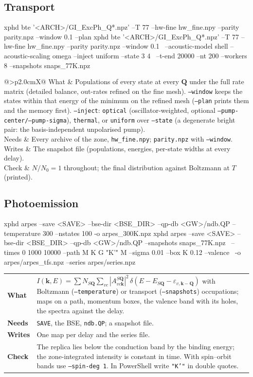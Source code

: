 \documentclass[10pt,a4paper]{article}
\makeatletter
\newcommand{\bQ}{\mathbf{Q}}
\newcommand{\step}[4]{%
  {\small\noindent\begin{tabularx}{\linewidth}{@{}>{\bfseries\leavevmode\color{accent}}p{2.0cm}X@{}}
  What & #1\\ Needs & #2\\ Writes & #3\\ Check & #4\end{tabularx}\par}\vspace{1.0ex}}
\makeatother
\begin{document}
\subsection{Transport}
\begin{cmd}
xphd bte '<ARCH>/GI_ExcPh_Q*.npz' --T 77 --hw-fine hw_fine.npy --parity parity.npz --window 0.1 --plan
xphd bte '<ARCH>/GI_ExcPh_Q*.npz' --T 77 --hw-fine hw_fine.npy --parity parity.npz --window 0.1 \
     --acoustic-model shell --acoustic-scaling omega --inject uniform --state 3 4 \
     --t-end 20000 --nt 200 --workers 8 --snapshots snaps_77K.npz
\end{cmd}
\step{Populations of every state at every $\bQ$ under the full rate matrix (detailed balance, out-rates refined on the fine mesh).
\texttt{--window} keeps the states within that energy of the minimum on the refined mesh (\texttt{--plan} prints them and the memory first).
\texttt{--inject}: \texttt{optical} (oscillator-weighted, optional \texttt{--pump-center/--pump-sigma}), \texttt{thermal}, or
\texttt{uniform} over \texttt{--state} (a degenerate bright pair: the basis-independent unpolarised pump).}
{Every archive of the zone, \texttt{hw\_fine.npy}; \texttt{parity.npz} with \texttt{--window}.}
{The snapshot file (populations, energies, per-state widths at every delay).}
{$N/N_0=1$ throughout; the final distribution against Boltzmann at $T$ (printed).}

\subsection{Photoemission}
\begin{cmd}
xphd arpes --save <SAVE> --bse-dir <BSE_DIR> --qp-db <GW>/ndb.QP --temperature 300 --nstates 100 -o arpes_300K.npz
xphd arpes --save <SAVE> --bse-dir <BSE_DIR> --qp-db <GW>/ndb.QP --snapshots snaps_77K.npz \
           --times 0 1000 10000 --path M K G "K'" M --sigma 0.01 --box K 0.12 --valence \
           -o arpes/arpes_{t}fs.npz --series arpes/series.npz
\end{cmd}
\step{$I(\mathbf{k},E)=\sum N_{S\bQ}\sum_{vc}|A^{S\bQ}_{vc\mathbf{k}}|^2\,\delta(E-E_{S\bQ}-\varepsilon_{v,\mathbf{k}-\bQ})$ with Boltzmann
(\texttt{--temperature}) or transport (\texttt{--snapshots}) occupations; maps on a path, momentum boxes, the valence band with its holes,
the spectra against the delay.}
{\texttt{SAVE}, the BSE, \texttt{ndb.QP}; a snapshot file.}
{One map per delay and the series file.}
{The replica lies below the conduction band by the binding energy; the zone-integrated intensity is constant in time.
With spin--orbit bands use \texttt{--spin-deg 1}. In PowerShell write \texttt{"K'"} in double quotes.}
\end{document}
